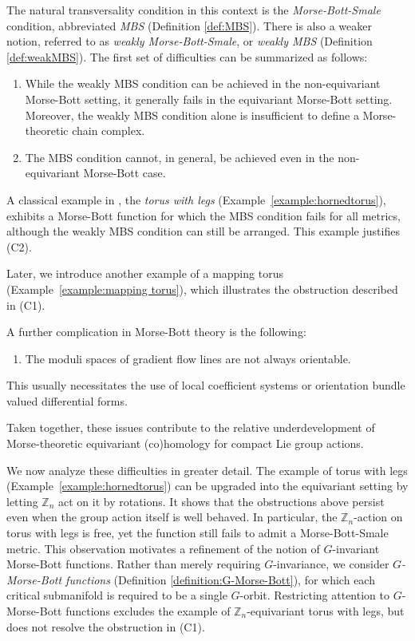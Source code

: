 \documentclass[11pt]{amsart}
\theoremstyle{definition}
\numberwithin{equation}{subsection}
\newcommand{\ZZ}{\mathbb{Z}}
\begin{document}
The natural transversality condition in this context is the 
\emph{Morse-Bott-Smale} condition, abbreviated \emph{MBS} (Definition \ref{def:MBS}). There is also a weaker 
notion, referred to as \emph{weakly Morse-Bott-Smale}, or \emph{weakly MBS} (Definition \ref{def:weakMBS}). The first 
set of difficulties can be summarized as follows:

\begin{enumerate}
    \item[(C1)] \label{c1}
    While the weakly MBS condition can be achieved in the non-equivariant Morse-Bott setting, it generally fails in the equivariant Morse-Bott setting.  Moreover, the weakly MBS condition alone is insufficient to define a Morse-theoretic chain complex.
    
    \item[(C2)]
    The MBS condition cannot, in general, be achieved even in the non-equivariant Morse-Bott case.
\end{enumerate}

A classical example in \cite{Latschev00}, the \emph{torus with legs} (Example~\ref{example:hornedtorus}), exhibits a Morse-Bott function for which the MBS condition fails for all metrics, although the weakly MBS condition can still be arranged.  This example justifies (C2).

Later, we introduce another example of a mapping torus (Example~\ref{example:mapping torus}), which illustrates the obstruction described in (C1).

\medskip

A further complication in Morse-Bott theory is the following:
\begin{enumerate}
    \item[(C3)]
    The moduli spaces of gradient flow lines are not always orientable.
\end{enumerate}
This usually necessitates the use of local coefficient systems or orientation bundle valued differential forms.

Taken together, these issues contribute to the relative underdevelopment of Morse-theoretic equivariant (co)homology for compact Lie group actions.

We now analyze these difficulties in greater detail. The example of torus with legs (Example~\ref{example:hornedtorus}) can be upgraded into the equivariant setting by letting $\ZZ_n$ act on it by rotations. It shows that the obstructions above persist even when the group action itself is well behaved.  In particular, the $\ZZ_n$-action on torus with legs is free, yet the function still fails to admit a Morse-Bott-Smale metric. This observation motivates a refinement of the notion of $G$-invariant Morse-Bott functions.  Rather than merely requiring $G$-invariance, we consider \emph{$G$-Morse-Bott functions} (Definition \ref{definition:G-Morse-Bott}), for which each critical submanifold is required to be a single $G$-orbit.  Restricting attention to $G$-Morse-Bott functions excludes the example of $\mathbb{Z}_n$-equivariant torus with legs, but does not resolve the obstruction in (C1).
\end{document}
